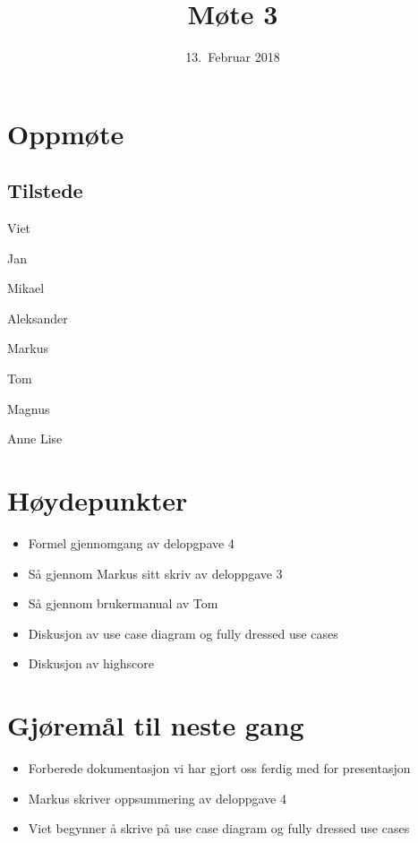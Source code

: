 \documentclass[letterpaper,11pt]{article}
\title{Møte 3}
\date{13.~Februar 2018}
\begin{document}
\maketitle
\section*{Oppmøte}
\subsection*{Tilstede}
\begin{list}{}{}
	\item Viet
	\item Jan
	\item Mikael
	\item Aleksander
	\item Markus
	\item Tom
	\item Magnus
	\item Anne Lise
\end{list}

\newpage
\section*{Høydepunkter}
\begin{itemize}
	\item Formel gjennomgang av delopgpave 4
	\item Så gjennom Markus sitt skriv av deloppgave 3
	\item Så gjennom brukermanual av Tom
	\item Diskusjon av use case diagram og fully dressed use cases
	\item Diskusjon av highscore
\end{itemize}

\section*{Gjøremål til neste gang}
\begin{itemize}
	\item Forberede dokumentasjon vi har gjort oss ferdig med for presentasjon
	\item Markus skriver oppsummering av deloppgave 4
	\item Viet begynner å skrive på use case diagram og fully dressed use cases
\end{itemize}
\end{document}
